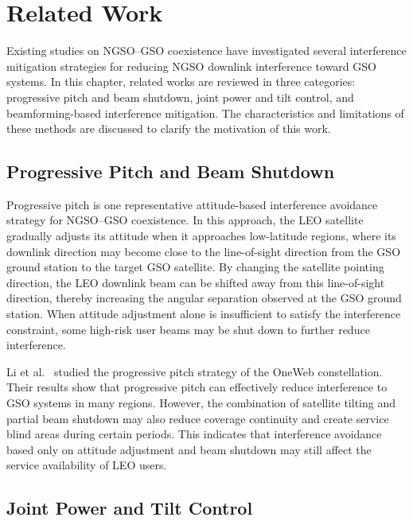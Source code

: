\section{Related Work}
\label{sec:related_work}

Existing studies on NGSO--GSO coexistence have investigated several interference mitigation strategies for reducing NGSO downlink interference toward GSO systems. In this chapter, related works are reviewed in three categories: progressive pitch and beam shutdown, joint power and tilt control, and beamforming-based interference mitigation. The characteristics and limitations of these methods are discussed to clarify the motivation of this work.

\subsection{Progressive Pitch and Beam Shutdown}
\label{subsec:progressive_pitch}

Progressive pitch is one representative attitude-based interference avoidance strategy for NGSO--GSO coexistence. In this approach, the LEO satellite gradually adjusts its attitude when it approaches low-latitude regions, where its downlink direction may become close to the line-of-sight direction from the GSO ground station to the target GSO satellite. By changing the satellite pointing direction, the LEO downlink beam can be shifted away from this line-of-sight direction, thereby increasing the angular separation observed at the GSO ground station. When attitude adjustment alone is insufficient to satisfy the interference constraint, some high-risk user beams may be shut down to further reduce interference.

Li et al.~\cite{li2021progressive} studied the progressive pitch strategy of the OneWeb constellation. Their results show that progressive pitch can effectively reduce interference to GSO systems in many regions. However, the combination of satellite tilting and partial beam shutdown may also reduce coverage continuity and create service blind areas during certain periods. This indicates that interference avoidance based only on attitude adjustment and beam shutdown may still affect the service availability of LEO users.

\subsection{Joint Power and Tilt Control}
\label{subsec:joint_power_tilt}

